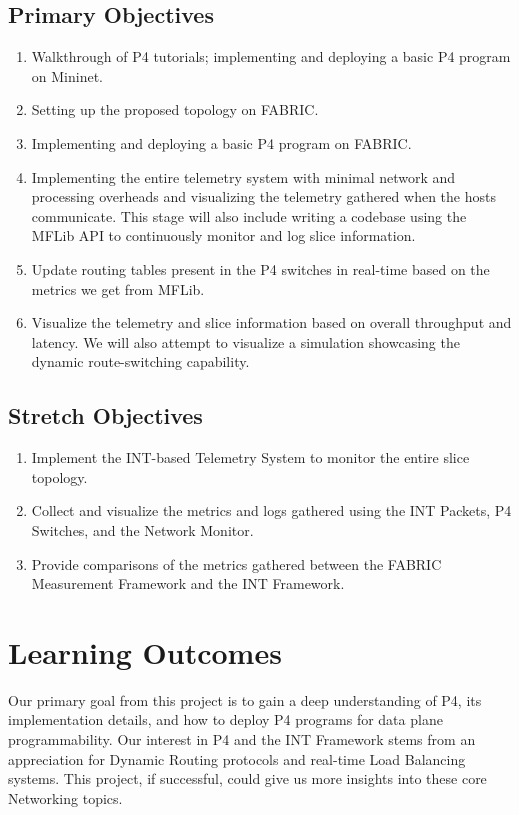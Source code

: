 \documentclass[conference]{IEEEtran}
\begin{document}
    \subsection{Primary Objectives}
    \begin{enumerate}
        \item Walkthrough of P4 tutorials; implementing and deploying a basic P4 program on Mininet.
        \item Setting up the proposed topology on FABRIC.
        \item Implementing and deploying a basic P4 program on FABRIC.
        \item Implementing the entire telemetry system with minimal network and processing overheads and visualizing the telemetry gathered when the hosts communicate. This stage will also include writing a codebase using the MFLib API to continuously monitor and log slice information.
        \item Update routing tables present in the P4 switches in real-time based on the metrics we get from MFLib.
        \item Visualize the telemetry and slice information based on overall throughput and latency. We will also attempt to visualize a simulation showcasing the dynamic route-switching capability.
    \end{enumerate}

    \subsection{Stretch Objectives}
    \begin{enumerate}
        \item Implement the INT-based Telemetry System to monitor the entire slice topology.
        \item Collect and visualize the metrics and logs gathered using the INT Packets, P4 Switches, and the Network Monitor.
        \item Provide comparisons of the metrics gathered between the FABRIC Measurement Framework and the INT Framework.
    \end{enumerate}


    \section{Learning Outcomes}
    Our primary goal from this project is to gain a deep understanding of P4, its implementation details, and how to deploy P4 programs for data plane programmability. Our interest in P4 and the INT Framework stems from an appreciation for Dynamic Routing protocols and real-time Load Balancing systems. This project, if successful, could give us more insights into these core Networking topics.
\end{document}
